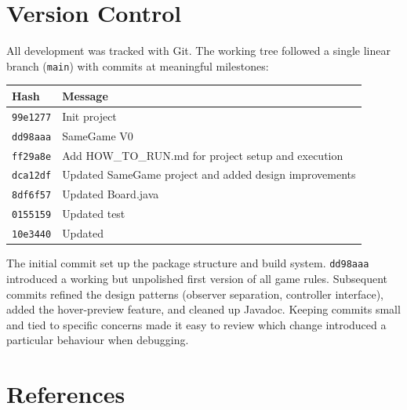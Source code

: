 \documentclass[12pt,a4paper]{article}
\begin{document}
\section{Version Control}
\label{sec:git}

All development was tracked with Git.
The working tree followed a single linear branch (\texttt{main}) with commits
at meaningful milestones:

\begin{center}
\begin{tabular}{@{}ll@{}}
\toprule
\textbf{Hash} & \textbf{Message} \\
\midrule
\texttt{99e1277} & Init project \\
\texttt{dd98aaa} & SameGame V0 \\
\texttt{ff29a8e} & Add HOW\_TO\_RUN.md for project setup and execution \\
\texttt{dca12df} & Updated SameGame project and added design improvements \\
\texttt{8df6f57} & Updated Board.java \\
\texttt{0155159} & Updated test \\
\texttt{10e3440} & Updated \\
\bottomrule
\end{tabular}
\end{center}

The initial commit set up the package structure and build system.
\texttt{dd98aaa} introduced a working but unpolished first version of all game
rules.
Subsequent commits refined the design patterns (observer separation,
controller interface), added the hover-preview feature, and cleaned up
Javadoc.
Keeping commits small and tied to specific concerns made it easy to review
which change introduced a particular behaviour when debugging.

\section{References}
\label{sec:refs}
\end{document}
